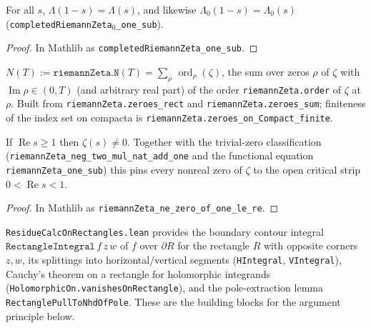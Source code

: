 \begin{theorem}
\label{thm:nf_completedZeta_one_sub}
\leanok
For all $s$, $\Lambda(1-s) = \Lambda(s)$, and likewise $\Lambda_0(1-s)=\Lambda_0(s)$
(\texttt{completedRiemannZeta}$_0$\texttt{\_one\_sub}).
\end{theorem}

\begin{proof}
\leanok
In Mathlib as \texttt{completedRiemannZeta\_one\_sub}.
\end{proof}

\begin{definition}
\label{def:nf_N}
\leanok
$N(T) := \texttt{riemannZeta.N}(T)
       = \sum_{\rho}\, \operatorname{ord}_\rho(\zeta)$, the sum over zeros $\rho$ of
$\zeta$ with $\operatorname{Im}\rho \in (0,T)$ (and arbitrary real part) of the order
\texttt{riemannZeta.order} of $\zeta$ at $\rho$. Built from
\texttt{riemannZeta.zeroes\_rect} and \texttt{riemannZeta.zeroes\_sum}; finiteness
of the index set on compacta is \texttt{riemannZeta.zeroes\_on\_Compact\_finite}.
\end{definition}

\begin{theorem}
\label{thm:nf_zeta_ne_zero_one_le}
\leanok
If $\operatorname{Re} s \ge 1$ then $\zeta(s)\neq 0$. Together with the trivial-zero
classification (\texttt{riemannZeta\_neg\_two\_mul\_nat\_add\_one} and the functional
equation \texttt{riemannZeta\_one\_sub}) this pins every nonreal zero of $\zeta$ to
the open critical strip $0<\operatorname{Re} s<1$.
\end{theorem}

\begin{proof}
\leanok
In Mathlib as \texttt{riemannZeta\_ne\_zero\_of\_one\_le\_re}.
\end{proof}

\begin{theorem}
\label{thm:nf_rectangle}
\leanok
\texttt{ResidueCalcOnRectangles.lean} provides the boundary contour integral
$\texttt{RectangleIntegral}\,f\,z\,w$ of $f$ over $\partial R$ for the rectangle $R$
with opposite corners $z,w$, its splittings into horizontal/vertical segments
(\texttt{HIntegral}, \texttt{VIntegral}), Cauchy's theorem on a rectangle for
holomorphic integrands (\texttt{HolomorphicOn.vanishesOnRectangle}), and the
pole-extraction lemma \texttt{RectanglePullToNhdOfPole}. These are the building
blocks for the argument principle below.
\end{theorem}

